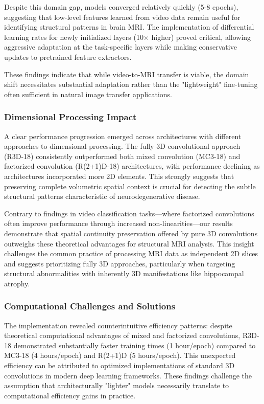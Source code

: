\documentclass[11pt, a4paper]{article}
\begin{document}
Despite this domain gap, models converged relatively quickly (5-8 epochs), suggesting that low-level features learned from video data remain useful for identifying structural patterns in brain MRI. The implementation of differential learning rates for newly initialized layers (10× higher) proved critical, allowing aggressive adaptation at the task-specific layers while making conservative updates to pretrained feature extractors.

These findings indicate that while video-to-MRI transfer is viable, the domain shift necessitates substantial adaptation rather than the "lightweight" fine-tuning often sufficient in natural image transfer applications.

\subsubsection{Dimensional Processing Impact}

A clear performance progression emerged across architectures with different approaches to dimensional processing. The fully 3D convolutional approach (R3D-18) consistently outperformed both mixed convolution (MC3-18) and factorized convolution (R(2+1)D-18) architectures, with performance declining as architectures incorporated more 2D elements. This strongly suggests that preserving complete volumetric spatial context is crucial for detecting the subtle structural patterns characteristic of neurodegenerative disease.

Contrary to findings in video classification tasks—where factorized convolutions often improve performance through increased non-linearities—our results demonstrate that spatial continuity preservation offered by pure 3D convolutions outweighs these theoretical advantages for structural MRI analysis. This insight challenges the common practice of processing MRI data as independent 2D slices and suggests prioritizing fully 3D approaches, particularly when targeting structural abnormalities with inherently 3D manifestations like hippocampal atrophy.

\subsubsection{Computational Challenges and Solutions}

The implementation revealed counterintuitive efficiency patterns: despite theoretical computational advantages of mixed and factorized convolutions, R3D-18 demonstrated substantially faster training times (1 hour/epoch) compared to MC3-18 (4 hours/epoch) and R(2+1)D (5 hours/epoch). This unexpected efficiency can be attributed to optimized implementations of standard 3D convolutions in modern deep learning frameworks. These findings challenge the assumption that architecturally "lighter" models necessarily translate to computational efficiency gains in practice.
\end{document}
